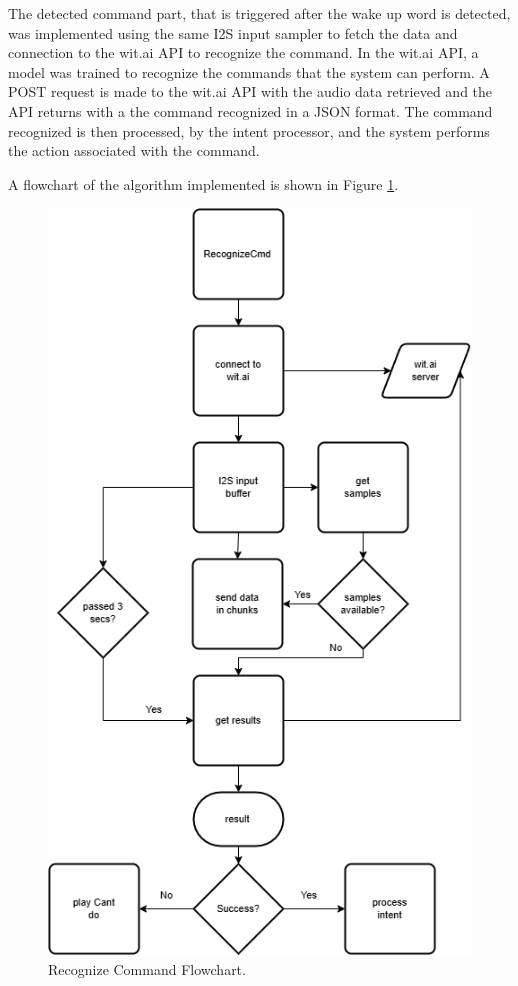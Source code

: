 The detected command part, that is triggered after the wake up word is detected, was implemented using the same I2S input sampler to fetch the data and connection to the wit.ai API to recognize the command. In the wit.ai API, a model was trained to recognize the commands that the system can perform. A POST request is made to the wit.ai API with the audio data retrieved and the API returns with a the command recognized in a JSON format. The command recognized is then processed, by the intent processor, and the system performs the action associated with the command. 

A flowchart of the algorithm implemented is shown in Figure \ref{fig:recognizeCmd}. 

\begin{figure}[H]
    \centering
    \includegraphics*[scale = 0.6]{Images/recognizeCmd.png}
    \caption{Recognize Command Flowchart.}
    \label{fig:recognizeCmd}
\end{figure}

